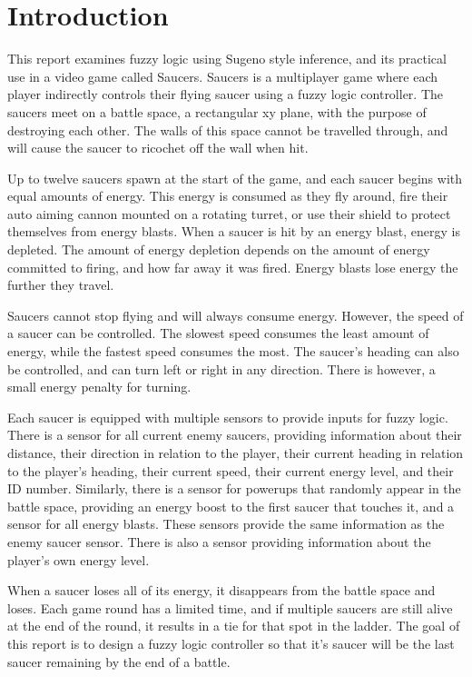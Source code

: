 \section{Introduction}

This report examines fuzzy logic using Sugeno style inference, and its practical use in a video game called Saucers. Saucers is a multiplayer game where each player indirectly controls their flying saucer using a fuzzy logic controller. The saucers meet on a battle space, a rectangular xy plane, with the purpose of destroying each other. The walls of this space cannot be travelled through, and will cause the saucer to ricochet off the wall when hit.

Up to twelve saucers spawn at the start of the game, and each saucer begins with equal amounts of energy. This energy is consumed as they fly around, fire their auto aiming cannon mounted on a rotating turret, or use their shield to protect themselves from energy blasts. When a saucer is hit by an energy blast, energy is depleted. The amount of energy depletion depends on the amount of energy committed to firing, and how far away it was fired. Energy blasts lose energy the further they travel.

Saucers cannot stop flying and will always consume energy. However, the speed of a saucer can be controlled. The slowest speed consumes the least amount of energy, while the fastest speed consumes the most. The saucer's heading can also be controlled, and can turn left or right in any direction. There is however, a small energy penalty for turning.

Each saucer is equipped with multiple sensors to provide inputs for fuzzy logic. There is a sensor for all current enemy saucers, providing information about their distance, their direction in relation to the player, their current heading in relation to the player's heading, their current speed, their current energy level, and their ID number. Similarly, there is a sensor for powerups that randomly appear in the battle space, providing an energy boost to the first saucer that touches it, and a sensor for all energy blasts. These sensors provide the same information as the enemy saucer sensor. There is also a sensor providing information about the player's own energy level.

When a saucer loses all of its energy, it disappears from the battle space and loses. Each game round has a limited time, and if multiple saucers are still alive at the end of the round, it results in a tie for that spot in the ladder. The goal of this report is to design a fuzzy logic controller so that it's saucer will be the last saucer remaining by the end of a battle.